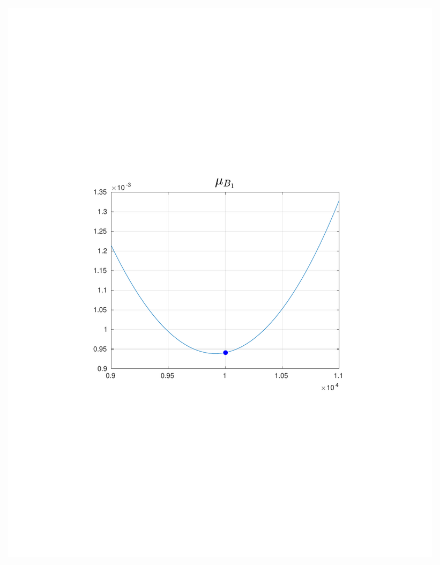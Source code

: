 \documentclass{beamer}
\begin{document}
\begin{frame}
\begin{columns}[t]
\begin{figure}
            \includegraphics[trim=4cm 4cm 4cm 8cm, clip=true, width=\linewidth]{img/FrictionActualComp}
        \end{figure}
    \end{columns}
\end{frame}
\end{document}
